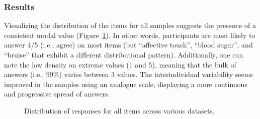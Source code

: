 \documentclass[
  man,
  floatsintext,
  longtable,
  nolmodern,
  notxfonts,
  notimes,
  colorlinks=true,linkcolor=blue,citecolor=blue,urlcolor=blue]{apa7}
\begin{document}
\subsubsection{Results}\label{results}

Visualizing the distribution of the items for all samples suggests the
presence of a consistent modal value (Figure~\ref{fig-distributions}).
In other words, participants are most likely to answer 4/5 (i.e., agree)
on most items (but ``affective touch'', ``blood sugar'', and ``bruise''
that exhibit a different distributional pattern). Additionally, one can
note the low density on extreme values (1 and 5), meaning that the bulk
of answers (i.e., 99\%) varies between 3 values. The interindividual
variability seems improved in the samples using an analogue scale,
displaying a more continuous and progressive spread of answers.

\begin{figure}

\caption{\label{fig-distributions}Distribution of responses for all
items across various datasets.}


\end{figure}%
\end{document}
